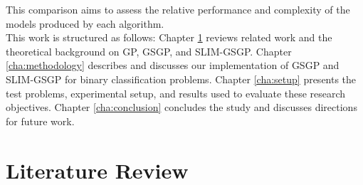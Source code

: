 \documentclass[manuscript, review, anonymous]{acmart} %
\begin{document}
This comparison aims to assess the relative performance and complexity of the models produced by each algorithm.\\
This work is structured as follows: 
Chapter \ref{ch:literature_review} reviews related work and the theoretical background on 
GP, GSGP, and SLIM-GSGP. Chapter \ref{cha:methodology} describes and discusses
our implementation of GSGP and SLIM-GSGP for binary classification problems.
Chapter \ref{cha:setup} presents the test problems, experimental setup, 
and results used to evaluate these research objectives. 
Chapter \ref{cha:conclusion} concludes the study and discusses directions for future work.






\section{Literature Review}
\label{ch:literature_review}
\end{document}
